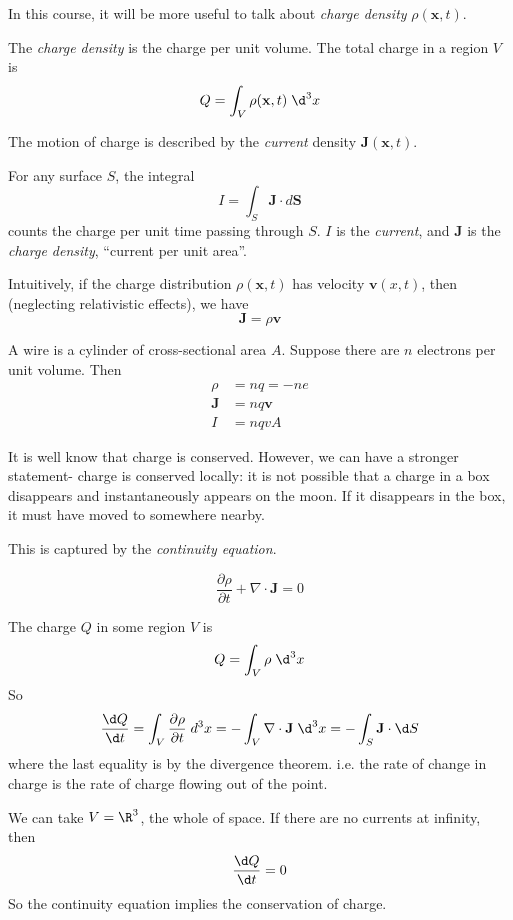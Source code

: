 \documentclass[a4paper]{article}
\begin{document}
In this course, it will be more useful to talk about \emph{charge density} $\rho(\mathbf{x}, t)$.
\begin{defi}
  The \emph{charge density} is the charge per unit volume. The total charge in a region $V$ is
  \[
    Q = \int_V \rho(\mathbf{x}, t)\; \d^3 x
  \]
\end{defi}

The motion of charge is described by the \emph{current} density $\mathbf{J}(\mathbf{x}, t)$.
\begin{defi}
For any surface $S$, the integral
\[
  I = \int_S \mathbf{J}\cdot d\mathbf{S}
\]
counts the charge per unit time passing through $S$. $I$ is the \emph{current}, and $\mathbf{J}$ is the \emph{charge density}, ``current per unit area''.
\end{defi}
Intuitively, if the charge distribution $\rho (\mathbf{x}, t)$ has velocity $\mathbf{v}(x, t)$, then (neglecting relativistic effects), we have
\[
  \mathbf{J} = \rho \mathbf{v}
\]

\begin{eg}
  A wire is a cylinder of cross-sectional area $A$. Suppose there are $n$ electrons per unit volume. Then
  \begin{align*}
    \rho &= nq = -ne\\
    \mathbf{J} &= nq\mathbf{v}\\
    I &= nqvA
  \end{align*}
\end{eg}

It is well know that charge is conserved. However, we can have a stronger statement- charge is conserved locally: it is not possible that a charge in a box disappears and instantaneously appears on the moon. If it disappears in the box, it must have moved to somewhere nearby.

This is captured by the \emph{continuity equation}.
\begin{law}
  \[
    \frac{\partial\rho}{\partial t} + \nabla\cdot \mathbf{J} = 0
  \]
\end{law}
The charge $Q$ in some region $V$ is
\[
  Q = \int_V \rho \;\d^3 x
\]
So
\[
  \frac{\d Q}{\d t} = \int_V \frac{\partial\rho}{\partial t}\; d^3 x = -\int_V \nabla\cdot \mathbf{J}\; \d^3 x = -\int_S \mathbf{J}\cdot \d S
\]
where the last equality is by the divergence theorem. i.e. the rate of change in charge is the rate of charge flowing out of the point.

We can take $V = \R^3$, the whole of space. If there are no currents at infinity, then
\[
  \frac{\d Q}{\d t} = 0
\]
So the continuity equation implies the conservation of charge.
\end{document}
